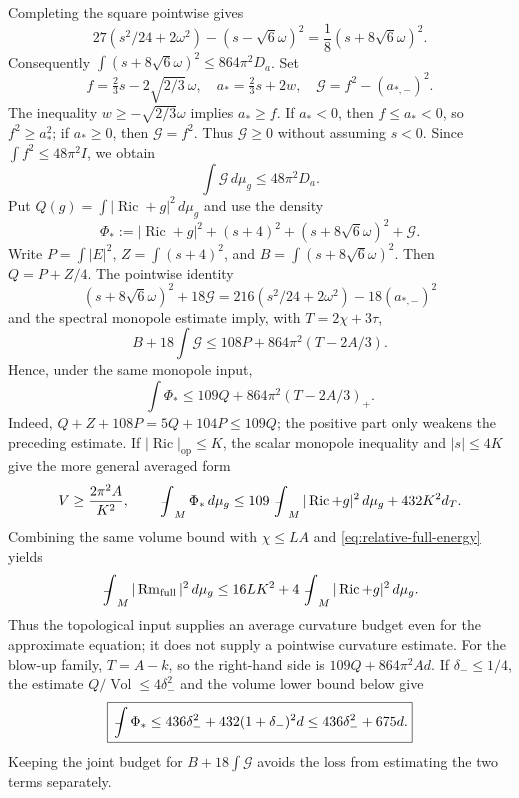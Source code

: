 \documentclass[a4paper,11pt]{article}
\numberwithin{equation}{section}
\theoremstyle{definition}
\newcommand{\Ric}{\operatorname{Ric}}
\newcommand{\Rm}{\operatorname{Rm}}
\newcommand{\Vol}{\operatorname{Vol}}
\newcommand{\op}{\mathrm{op}}
\newcommand{\dd}{\,d\mu_g}
\newcommand{\fint}{\mathop{\rlap{\,\raisebox{0.1ex}{\tiny$-$}}\int}\nolimits}
\begin{document}
Completing the square pointwise gives
\begin{equation}\label{eq:square}
27(s^2/24+2\omega^2)-(s-\sqrt6\omega)^2
=\frac18(s+8\sqrt6\omega)^2.
\end{equation}
Consequently $\int(s+8\sqrt6\omega)^2\le864\pi^2D_a$. Set
\[
f=\tfrac23s-2\sqrt{2/3}\,\omega,\quad a_*=\tfrac23s+2w,
\quad\mathcal G=f^2-(a_{*,-})^2.
\]
The inequality $w\ge-\sqrt{2/3}\omega$ implies $a_*\ge f$. If $a_*<0$, then
$f\le a_*<0$, so $f^2\ge a_*^2$; if $a_*\ge0$, then
$\mathcal G=f^2$. Thus $\mathcal G\ge0$ without assuming $s<0$.
Since $\int f^2\le48\pi^2I$, we obtain
\begin{equation}
\int\mathcal G\dd\le48\pi^2D_a.
\end{equation}
Put $Q(g)=\int|\Ric+g|^2\dd$ and use the density
\begin{equation}\label{eq:Phistar}
\Phi_*:=|\Ric+g|^2+(s+4)^2+(s+8\sqrt6\omega)^2+\mathcal G.
\end{equation}
Write $P=\int|E|^2$, $Z=\int(s+4)^2$, and $B=\int(s+8\sqrt6\omega)^2$. Then $Q=P+Z/4$. The pointwise identity
\begin{equation}\label{eq:joint-density-identity}
(s+8\sqrt6\omega)^2+18\mathcal G
=216(s^2/24+2\omega^2)-18(a_{*,-})^2
\end{equation}
and the spectral monopole estimate imply, with $T=2\chi+3\tau$,
\[
B+18\int\mathcal G\le108P+864\pi^2(T-2A/3).
\]
Hence, under the same monopole input,
\begin{equation}\label{eq:109}
\boxed{\int\Phi_*\le109Q+864\pi^2(T-2A/3)_+.}
\end{equation}
Indeed, $Q+Z+108P=5Q+104P\le109Q$; the positive part only weakens the preceding estimate. If $|\Ric|_{\op}\le K$, the scalar monopole inequality and $|s|\le4K$ give the more general averaged form
\begin{equation}\label{eq:general-L2-budget}
V\ge\frac{2\pi^2A}{K^2},\qquad
\fint_M\Phi_*\dd\le109\fint_M|\Ric+g|^2\dd+432K^2d_T.
\end{equation}
Combining the same volume bound with $\chi\le LA$ and \eqref{eq:relative-full-energy} yields
\begin{equation}\label{eq:approximate-energy-budget}
\fint_M|\Rm_{\rm full}|^2\dd
\le16LK^2+4\fint_M|\Ric+g|^2\dd.
\end{equation}
Thus the topological input supplies an average curvature budget even for the approximate equation; it does not supply a pointwise curvature estimate.
For the blow-up family, $T=A-k$, so the right-hand side is $109Q+864\pi^2Ad$. If $\delta_-\le1/4$, the estimate $Q/\Vol\le4\delta_-^2$ and the volume lower bound below give
\begin{equation}\label{eq:436675}
\boxed{\fint\Phi_*\le436\delta_-^2+432(1+\delta_-)^2d
\le436\delta_-^2+675d.}
\end{equation}
Keeping the joint budget for $B+18\int\mathcal G$ avoids the loss from estimating the two terms separately.
\end{document}
